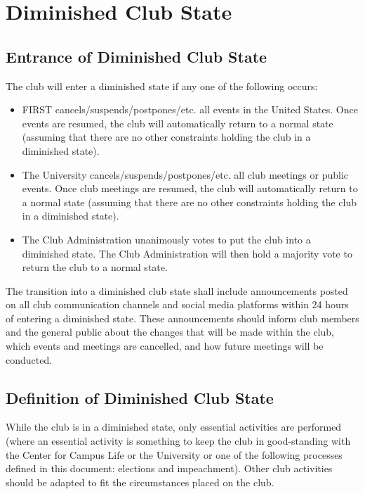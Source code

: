 \documentclass[english,11pt]{article}
\begin{document}
\section{Diminished Club State} \label{art:reduced}

\subsection{Entrance of Diminished Club State} \label{sect:reduced:entrance}
The club will enter a diminished state if any one of the following occurs:

\begin{itemize}
    \item FIRST cancels/suspends/postpones/etc. all events in the United States.
        Once events are resumed, the club will automatically return to a normal state (assuming that there are no other constraints holding the club in a diminished state).
    \item The University cancels/suspends/postpones/etc. all club meetings or public events.
        Once club meetings are resumed, the club will automatically return to a normal state (assuming that there are no other constraints holding the club in a diminished state).
    \item The Club Administration unanimously votes to put the club into a diminished state.
        The Club Administration will then hold a majority vote to return the club to a normal state.
\end{itemize}

The transition into a diminished club state shall include announcements posted on all club communication channels and social media platforms within 24 hours of entering a diminished state.
These announcements should inform club members and the general public about the changes that will be made within the club, which events and meetings are cancelled, and how future meetings will be conducted.

\subsection{Definition of Diminished Club State} \label{sect:reduced:definition}
While the club is in a diminished state, only essential activities are performed (where an essential activity is something to keep the club in good-standing with the Center for Campus Life or the University or one of the following processes defined in this document: elections and impeachment).
Other club activities should be adapted to fit the circumstances placed on the club.
\end{document}
